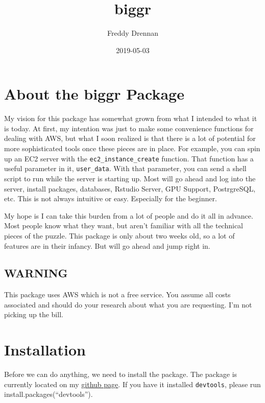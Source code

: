 \documentclass[]{book}
\title{biggr}
\author{Freddy Drennan}
\date{2019-05-03}
\begin{document}
\maketitle

{
\setcounter{tocdepth}{1}
\tableofcontents
}
\hypertarget{about-the-biggr-package}{%
\chapter{About the biggr Package}\label{about-the-biggr-package}}

My vision for this package has somewhat grown from what I intended to what it is today. At first, my intention was just to make some convenience functions for dealing with AWS, but what I soon realized is that there is a lot of potential for more sophisticated tools once these pieces are in place. For example, you can spin up an EC2 server with the \texttt{ec2\_instance\_create} function. That function has a useful parameter in it, \texttt{user\_data}. With that parameter, you can send a shell script to run while the server is starting up. Most will go ahead and log into the server, install packages, databases, Rstudio Server, GPU Support, PostrgreSQL, etc. This is not always intuitive or easy. Especially for the beginner.

My hope is I can take this burden from a lot of people and do it all in advance. Most people know what they want, but aren't familiar with all the technical pieces of the puzzle. This package is only about two weeks old, so a lot of features are in their infancy. But will go ahead and jump right in.

\hypertarget{warning}{%
\section{WARNING}\label{warning}}

This package uses AWS which is not a free service. You assume all costs associated and should do your research about what you are requesting. I'm not picking up the bill.

\hypertarget{installation}{%
\chapter{Installation}\label{installation}}

Before we can do anything, we need to install the package. The package is currently located on my \href{https://github.com/fdrennan/biggr}{github page}. If you have it installed \texttt{devtools}, please run install.packages(``devtools'').
\end{document}
